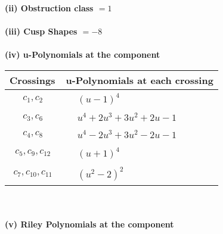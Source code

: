\documentclass[1p]{elsarticle_modified}
\theoremstyle{definition}
\begin{document}
\flushleft \textbf{(ii) Obstruction class $= 1$}\\~\\
\flushleft \textbf{(iii) Cusp Shapes $= -8$}\\~\\
\newpage\renewcommand{\arraystretch}{1}
\flushleft \textbf{(iv) u-Polynomials at the component}\newline \\
\begin{tabular}{m{50pt}|m{274pt}}
Crossings & \hspace{64pt}u-Polynomials at each crossing \\
\hline $$\begin{aligned}c_{1},c_{2}\end{aligned}$$&$\begin{aligned}
&(u-1)^4
\end{aligned}$\\
\hline $$\begin{aligned}c_{3},c_{6}\end{aligned}$$&$\begin{aligned}
&u^4+2 u^3+3 u^2+2 u-1
\end{aligned}$\\
\hline $$\begin{aligned}c_{4},c_{8}\end{aligned}$$&$\begin{aligned}
&u^4-2 u^3+3 u^2-2 u-1
\end{aligned}$\\
\hline $$\begin{aligned}c_{5},c_{9},c_{12}\end{aligned}$$&$\begin{aligned}
&(u+1)^4
\end{aligned}$\\
\hline $$\begin{aligned}c_{7},c_{10},c_{11}\end{aligned}$$&$\begin{aligned}
&(u^2-2)^2
\end{aligned}$\\
\hline
\end{tabular}\\~\\
\newpage\renewcommand{\arraystretch}{1}
\flushleft \textbf{(v) Riley Polynomials at the component}\newline \\
\end{document}
